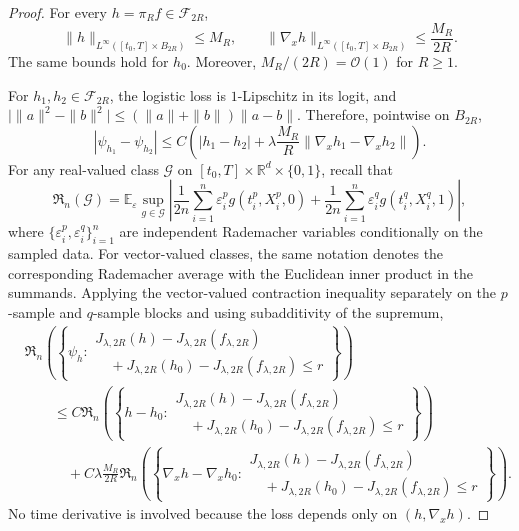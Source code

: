 \documentclass[11pt]{article}
\theoremstyle{plain}
\theoremstyle{definition}
\theoremstyle{remark}
\begin{document}
\begin{proof}
For every \(h=\pi_R f\in\mathcal F_{2R}\),
\[
\|h\|_{L^\infty([t_0,T]\times B_{2R})}\le M_R,
\qquad
\|\nabla_xh\|_{L^\infty([t_0,T]\times B_{2R})}\le \frac{M_R}{2R}.
\]
The same bounds hold for \(h_0\). Moreover, \(M_R/(2R)=\mathcal{O}(1)\) for \(R\ge1\).

For \(h_1,h_2\in\mathcal F_{2R}\), the logistic loss is \(1\)-Lipschitz in
its logit, and
$
\big|\|a\|^2-\|b\|^2\big|
\le
(\|a\|+\|b\|)\|a-b\|.
$
Therefore, pointwise on \(B_{2R}\),
\[
|\psi_{h_1}-\psi_{h_2}|
\le
C\left(
|h_1-h_2|
+
\lambda\frac{M_R}{R}
\|\nabla_xh_1-\nabla_xh_2\|
\right).
\]
For any real-valued class \(\mathcal G\) on
\([t_0,T]\times\mathbb R^d\times\{0,1\}\), recall that
\[
\mathfrak R_n(\mathcal G)
=
\mathbb E_\varepsilon
\sup_{g\in\mathcal G}
\left|
\frac1{2n}\sum_{i=1}^n\varepsilon_i^p g(t_i^p,X_i^p,0)
+
\frac1{2n}\sum_{i=1}^n\varepsilon_i^q g(t_i^q,X_i^q,1)
\right|,
\]
where \(\{\varepsilon_i^p,\varepsilon_i^q\}_{i=1}^n\) are independent
Rademacher variables conditionally on the sampled data. For vector-valued
classes, the same notation denotes the corresponding Rademacher average with
the Euclidean inner product in the summands.
Applying the vector-valued contraction inequality separately on the
\(p\)-sample and \(q\)-sample blocks and using subadditivity of the supremum,
\[
\begin{aligned}
&\mathfrak R_n\left(
\left\{
\psi_h:
\begin{array}{l}
J_{\lambda,2R}(h)-J_{\lambda,2R}(f_{\lambda,2R})\\
\quad+J_{\lambda,2R}(h_0)-J_{\lambda,2R}(f_{\lambda,2R})\le r
\end{array}
\right\}
\right)\\
&\qquad\le
C\mathfrak R_n\left(
\left\{
h-h_0:
\begin{array}{l}
J_{\lambda,2R}(h)-J_{\lambda,2R}(f_{\lambda,2R})\\
\quad+J_{\lambda,2R}(h_0)-J_{\lambda,2R}(f_{\lambda,2R})\le r
\end{array}
\right\}
\right)\\
&\qquad\quad+
C\lambda\frac{M_R}{2R}
\mathfrak R_n\left(
\left\{
\nabla_xh-\nabla_xh_0:
\begin{array}{l}
J_{\lambda,2R}(h)-J_{\lambda,2R}(f_{\lambda,2R})\\
\quad+J_{\lambda,2R}(h_0)-J_{\lambda,2R}(f_{\lambda,2R})\le r
\end{array}
\right\}
\right).
\end{aligned}
\]
No time derivative is involved because the loss depends only on
\((h,\nabla_xh)\).


\end{proof}
\end{document}
